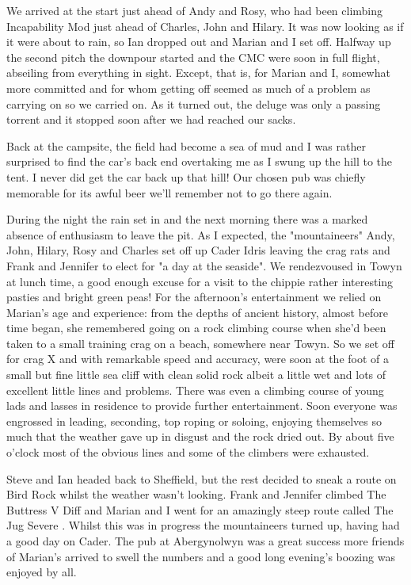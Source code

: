 \documentclass[a5paper,openany,font 10pt]{scrbook}
\begin{document}
We arrived at the start just ahead of Andy and Rosy, who had
been climbing  Incapability   Mod  just ahead of Charles, John and
Hilary. It was now looking as if it were about to rain, so Ian
dropped out and Marian and I set off. Halfway up the second pitch
the downpour started and the CMC were soon in full flight,
abseiling from everything in sight. Except, that is, for Marian
and I, somewhat more committed and for whom getting off seemed as
much of a problem as carrying on   so we carried on. As it turned
out, the deluge was only a passing torrent and it stopped soon
after we had reached our sacks.

Back at the campsite, the field had become a sea of mud and
I was rather surprised to find the car's back end overtaking me
as I swung up the hill to the tent. I never did get the car back
up that hill! Our chosen pub was chiefly memorable for its awful
beer   we'll remember not to go there again.

During the night the rain set in and the next morning there
was a marked absence of enthusiasm to leave the pit. As I
expected, the "mountaineers"  Andy, John, Hilary, Rosy and
Charles  set off up Cader Idris leaving the crag rats and Frank
and Jennifer to elect for "a day at the seaside". We rendezvoused
in Towyn at lunch time, a good enough excuse for a visit to the
chippie   rather interesting pasties and bright green peas! For
the afternoon's entertainment we relied on Marian's age and
experience: from the depths of ancient history, almost before
time began, she remembered going on a rock climbing course when
she'd been taken  to a small training crag on a beach, somewhere
near Towyn. So we set off for crag X and with remarkable speed
and accuracy, were soon at the foot of a small but fine little
sea cliff with clean solid rock  albeit a little wet  and lots of
excellent little lines and problems. There was even a climbing
course of young lads and lasses in residence to provide further
entertainment. Soon everyone was engrossed in leading, seconding,
top roping or soloing, enjoying themselves so much that the
weather gave up in disgust and the rock dried out.  By about five
o'clock most of the obvious lines  and some of the climbers  were
exhausted.

Steve and Ian headed back to Sheffield, but the rest decided
to sneak a route on Bird Rock whilst the weather wasn't looking.
Frank and Jennifer climbed  The Buttress   V Diff  and Marian and I
went for an amazingly steep route called  The Jug   Severe . Whilst
this was in progress the mountaineers turned up, having had a
good day on Cader. The pub at Abergynolwyn was a great success
more friends of Marian's arrived to swell the numbers and a good
long evening's boozing was enjoyed by all.
\end{document}
